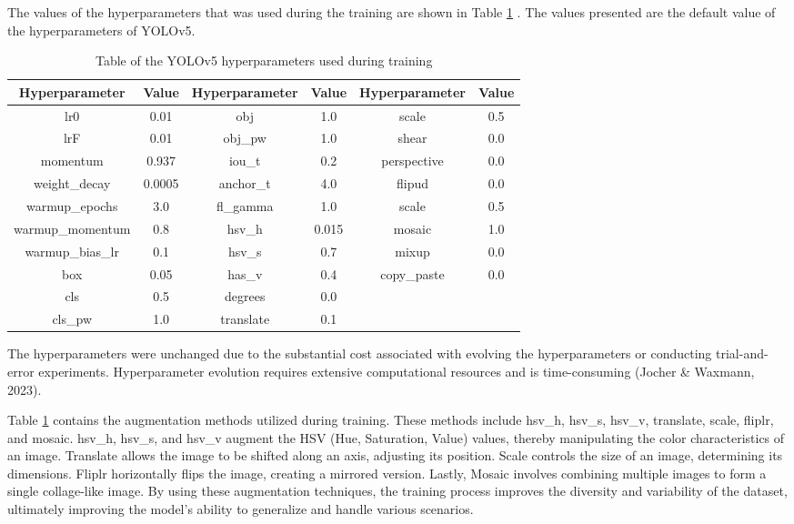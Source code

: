 The values of the hyperparameters that was used during the training are shown in Table \ref{tab:hyperparameters} . The values presented are the default value of the hyperparameters of YOLOv5.

\begin{table}[ht]   %
	\centering
	\caption{Table of the YOLOv5 hyperparameters used during training} \vspace{0.25em}
	\begin{tabular}{c|c|c|c|c|c} \hline
		\centering \textbf{Hyperparameter} & \textbf{Value} &\textbf{Hyperparameter} & \textbf{Value} & \textbf{Hyperparameter} & \textbf{Value} \\ \hline
		lr0  & 0.01   & obj & 1.0 & scale &0.5 \\
		lrF  & 0.01   & obj\_pw & 1.0 & shear &0.0 \\
		momentum  & 0.937   & iou\_t & 0.2 & perspective &0.0 \\
		weight\_decay  & 0.0005  & anchor\_t & 4.0 & flipud &0.0 \\
		warmup\_epochs  & 3.0  & fl\_gamma & 1.0 & scale &0.5 \\
		warmup\_momentum  & 0.8   & hsv\_h & 0.015 & mosaic &1.0 \\
		warmup\_bias\_lr  & 0.1   & hsv\_s & 0.7 & mixup &0.0 \\
		box  & 0.05   & has\_v & 0.4 & copy\_paste &0.0 \\
		cls  & 0.5   & degrees & 0.0 &  & \\
		cls\_pw  & 1.0   & translate & 0.1 &  &  \\
		 \hline
		
	\end{tabular}
	\label{tab:hyperparameters}
\end{table}
\FloatBarrier

The hyperparameters were unchanged due to the substantial cost associated with evolving the hyperparameters or conducting trial-and-error experiments. Hyperparameter evolution requires extensive computational resources and is time-consuming (Jocher \& Waxmann, 2023).

Table \ref{tab:hyperparameters} contains the augmentation methods utilized during training. These methods include hsv\_h, hsv\_s, hsv\_v, translate, scale, fliplr, and mosaic. hsv\_h, hsv\_s, and hsv\_v augment the HSV (Hue, Saturation, Value) values, thereby manipulating the color characteristics of an image. Translate allows the image to be shifted along an axis, adjusting its position. Scale controls the size of an image, determining its dimensions. Fliplr horizontally flips the image, creating a mirrored version. Lastly, Mosaic involves combining multiple images to form a single collage-like image. By using these augmentation techniques, the training process improves the diversity and variability of the dataset, ultimately improving the model's ability to generalize and handle various scenarios.

